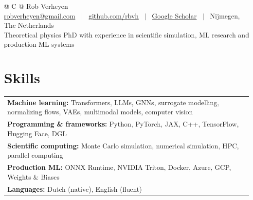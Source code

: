 \documentclass[a4paper,10pt]{article}
\begin{document}
\fontsize{10.5pt}{11.8pt}\selectfont
\RaggedRight
{}
\setlength{\parskip}{3pt}
\pagestyle{empty}

\begin{tabularx}{\linewidth}{@{} C @{}}
\huge{Rob Verheyen} \\[2pt]
\href{mailto:robverheyen@gmail.com}{robverheyen@gmail.com} \ $|$ \
\href{https://github.com/rbvh}{github.com/rbvh} \ $|$ \
\href{https://scholar.google.com/citations?user=MRTAm7UAAAAJ}{Google Scholar} \ $|$ \
Nijmegen, The Netherlands \\[3pt]
Theoretical physics PhD with experience in scientific simulation, ML research and production ML systems
\end{tabularx}

\section{Skills}
\begin{tabularx}{\linewidth}{@{}X@{}}
\textbf{Machine learning:} Transformers, LLMs, GNNs, surrogate modelling, normalizing flows, VAEs, multimodal models, computer vision \\
\textbf{Programming \& frameworks:} Python, PyTorch, JAX, C++, TensorFlow, Hugging Face, DGL \\
\textbf{Scientific computing:} Monte Carlo simulation, numerical simulation, HPC, parallel computing \\
\textbf{Production ML:} ONNX Runtime, NVIDIA Triton, Docker, Azure, GCP, Weights \& Biases \\
\textbf{Languages:} Dutch (native), English (fluent) \\
\end{tabularx}
\end{document}
